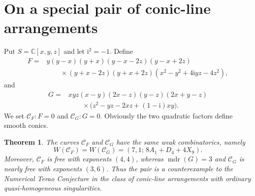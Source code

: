 \documentclass[10pt,a4paper]{amsart}
\newtheorem{theorem}{Theorem}[section]
\newcommand{\mdr}{\operatorname{mdr}}
\newcommand{\ii}{\mathrm i}
\begin{document}
\section{On a special pair of conic-line arrangements}

Put $S=\mathbb C[x,y,z]$ and let $\ii^2=-1$.  Define
\begin{align*}
 F={}&y(y-x)(y+x)(y-x-2z)(y-x+2z)\\
 &\qquad\times (y+x-2z)(y+x+2z)
       (x^2-y^2+4\ii yz-4z^2),
\end{align*}
and
\begin{align*}
 G={}&xyz(x-y)(2x-z)(y-z)(2x+y-z)\\
 &\qquad\times \bigl(z^2-yz-2xz+(1-\ii)xy\bigr).
\end{align*}
We set $\mathcal C_F : F=0$ and $\mathcal C_G : G=0$. Obviously the two quadratic factors define smooth conics. 

\begin{theorem}\label{thm:counterexample}
The curves $\mathcal C_F$ and $\mathcal C_G$ have the same weak
combinatorics, namely
\[
 W(\mathcal C_F)=W(\mathcal C_G)
 =(7,1;\,8A_1+D_4+4X_9).
\]
Moreover, $\mathcal C_F$ is free with exponents $(4,4)$, whereas
$ \mdr(G)=3$ and $\mathcal{C}_G$ is nearly free with exponents $(3,6)$.
Thus the pair is a counterexample to the Numerical Terao Conjecture in the class of conic-line arrangements with ordinary quasi-homogeneous singularities. 
\end{theorem}
\end{document}
